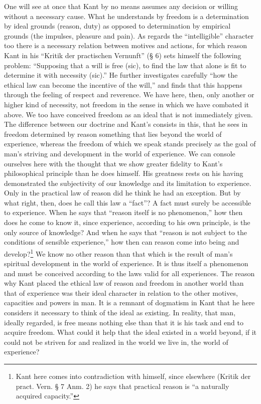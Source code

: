 \documentclass[12pt,a4paper,openany]{book}
\newcommand{\opage}[1]{\marginnote{\footnotesize\textit{[#1]}}}
\begin{document}
One will see at once that Kant by no means assumes any decision or willing
without a necessary cause. What he understands by freedom is a determination
by ideal grounds (reason, duty) as opposed to determination by empirical
grounds (the impulses, pleasure and pain). As regards the ``intelligible''
character too there is a necessary relation between motives and actions, for
which reason Kant in his ``Kritik der practischen Vernunft'' (§ 6) sets
himself the following problem: ``Supposing that a will is free (sic), to
find the law that alone is fit to determine it with necessity (sic).'' He
further investigates carefully ``how the ethical law can become the
incentive of the will,'' and finds that this happens through the feeling of
respect and reverence. We have here, then, only another or higher kind of
necessity, not freedom in the sense in which we have combated it above. We
too have conceived freedom as an ideal that is not immediately given. The
difference between our doctrine and Kant's consists in this, that he sees in
freedom determined by reason something that lies beyond the world of
experience, whereas the freedom of which we speak stands precisely as the
goal of man's striving and development in the world of experience. We can
console ourselves here with the thought that we show greater fidelity to
Kant's philosophical principle than he does himself. His greatness rests on
his having demonstrated the subjectivity of our knowledge and its limitation
to experience. Only \opage{135}in the practical law of reason did he think
he had an exception. But by what right, then, does he call this law a
``fact''? A fact must surely be accessible to experience. When he says that
``reason itself is no phenomenon,'' how then does he come to know it, since
experience, according to his own principle, is the only source of knowledge?
And when he says that ``reason is not subject to the conditions of sensible
experience,'' how then can reason come into being and
develop?\footnote[1]{Kant here comes into contradiction with himself, since
elsewhere (Kritik der pract. Vern. § 7 Anm. 2) he says that practical reason
is ``a naturally acquired capacity.''} We know no other reason than that
which is the result of man's spiritual development in the world of
experience. It is thus itself a phenomenon and must be conceived according
to the laws valid for all experiences. The reason why Kant placed the
ethical law of reason and freedom in another world than that of experience
was their ideal character in relation to the other motives, capacities and
powers in man. It is a remnant of dogmatism in Kant that he here considers
it necessary to think of the ideal as existing. In reality, that man,
ideally regarded, is free means nothing else than that it is his task and
end to acquire freedom. What could it help that the ideal existed in a world
beyond, if it could not be striven for and realized in the world we live in,
the world of experience?
\end{document}
